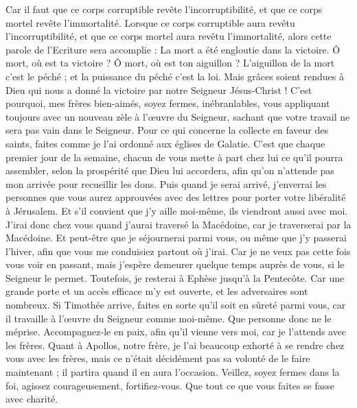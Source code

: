 \begin{multicols}{2}
Car il faut que ce corps corruptible revête l'incorruptibilité, et que ce corps mortel revête l'immortalité.
Lorsque ce corps corruptible aura revêtu l'incorruptibilité, et que ce corps mortel aura revêtu l'immortalité, alors cette parole de l'Ecriture sera accomplie : La mort a été engloutie dans la victoire.
Ô mort, où est ta victoire ? Ô mort, où est ton aiguillon ?
L'aiguillon de la mort c'est le péché ; et la puissance du péché c'est la loi.
Mais grâces soient rendues à Dieu qui nous a donné la victoire par notre Seigneur Jésus-Christ !
C'est pourquoi, mes frères bien-aimés, soyez fermes, inébranlables, vous appliquant toujours avec un nouveau zèle à l’œuvre du Seigneur, sachant que votre travail ne sera pas vain dans le Seigneur.
\VerseOne{}Pour ce qui concerne la collecte en faveur des saints, faites comme je l’ai ordonné aux églises de Galatie.
C’est que chaque premier jour de la semaine, chacun de vous mette à part chez lui ce qu’il pourra assembler, selon la prospérité que Dieu lui accordera, afin qu’on n’attende pas mon arrivée pour recueillir les dons.
Puis quand je serai arrivé, j'enverrai les personnes que vous aurez approuvées avec des lettres pour porter votre libéralité à Jérusalem.
Et s’il convient que j’y aille moi-même, ils viendront aussi avec moi.
J'irai donc chez vous quand j’aurai traversé la Macédoine, car je traverserai par la Macédoine.
Et peut-être que je séjournerai parmi vous, ou même que j'y passerai l'hiver, afin que vous me conduisiez partout où j’irai.
Car je ne veux pas cette fois vous voir en passant, mais j’espère demeurer quelque temps auprès de vous, si le Seigneur le permet.
Toutefois, je resterai à Ephèse jusqu'à la Pentecôte.
Car une grande porte et un accès efficace m'y est ouverte, et les adversaires sont nombreux.
Si Timothée arrive, faites en sorte qu'il soit en sûreté parmi vous, car il travaille à l’œuvre du Seigneur comme moi-même.
Que personne donc ne le méprise. Accompagnez-le en paix, afin qu'il vienne vers moi, car je l'attends avec les frères.
Quant à Apollos, notre frère, je l'ai beaucoup exhorté à se rendre chez vous avec les frères, mais ce n’était décidément pas sa volonté de le faire maintenant ; il partira quand il en aura l’occasion.
Veillez, soyez fermes dans la foi, agissez courageusement, fortifiez-vous.
Que tout ce que vous faites se fasse avec charité.

\end{multicols}
